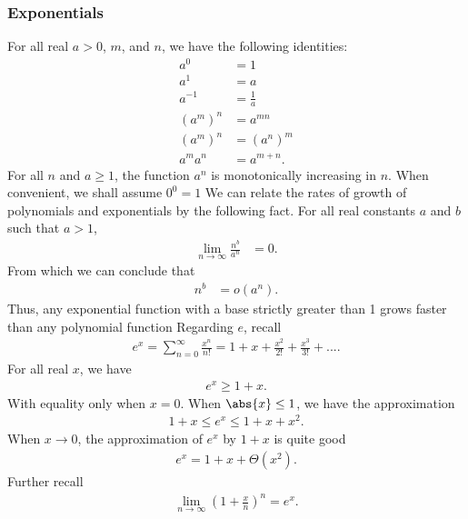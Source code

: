 \documentclass{report}
\begin{document}
        \subsubsection{Exponentials}
        \bigbreak \noindent 
        For all real $a>0$, $m$, and $n$, we have the following identities:
        \begin{align*}
            a^{0} &= 1 \\
            a^{1} &= a \\
            a^{-1} &= \frac{1}{a} \\
            (a^{m})^{n}  &= a^{mn} \\
            (a^{m})^{n} &= (a^{n})^{m} \\
            a^{m}a^{n} &= a^{m+n}
        .\end{align*}
        \bigbreak \noindent 
        For all $n$ and $a \geq 1$, the function $a^{n}$ is monotonically increasing in $n$. When convenient, we shall assume $0^{0} = 1$
        \bigbreak \noindent 
        We can relate the rates of growth of polynomials and exponentials by the following fact. For all real constants $a$ and $b$ such that $a>1$,
        \begin{align*}
            \lim\limits_{n \to \infty}{\frac{n^{b}}{a^{n}}} &=0
        .\end{align*}
        \bigbreak \noindent 
        From which we can conclude that 
        \begin{align*}
            n^{b} &= o(a^{n})
        .\end{align*}
        \bigbreak \noindent 
        Thus, any exponential function with a base strictly greater than 1 grows faster than any polynomial function
        \bigbreak \noindent 
        Regarding $e$, recall
        \begin{align*}
            e^{x} = \sum_{n=0}^{\infty}\frac{x^{n}}{n!} = 1 + x + \frac{x^{2}}{2!} + \frac{x^{3}}{3!} + ...
        .\end{align*}
        \bigbreak \noindent 
        For all real $x$, we have
        \begin{align*}
            e^{x} \geq 1+x
        .\end{align*}
        With equality only when $x=0$. When $\abs{x} \leq 1 $, we have the approximation
        \begin{align*}
            1 + x \leq e^{x} \leq1 + x + x^{2}
        .\end{align*}
        When $x\to 0$, the approximation of $e^{x}$ by $1+x$ is quite good
        \begin{align*}
            e^{x} = 1 + x + \Theta(x^{2})
        .\end{align*}
        Further recall
        \begin{align*}
            \lim\limits_{n \to \infty}{\left(1+\frac{x}{n}\right)}^{n} = e^{x}
        .\end{align*}
\end{document}
